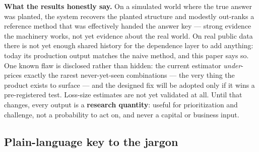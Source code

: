 \documentclass[11pt]{article}
\begin{document}
\textbf{What the results honestly say.} On a simulated world where the true
answer was planted, the system recovers the planted structure and modestly
out-ranks a reference method that was effectively handed the answer key ---
strong evidence the machinery works, not yet evidence about the real world.
On real public data there is not yet enough shared history for the
dependence layer to add anything: today its production output matches the
naive method, and this paper says so. One known flaw is disclosed rather
than hidden: the current estimator \emph{under}-prices exactly the rarest
never-yet-seen combinations --- the very thing the product exists to
surface --- and the designed fix will be adopted only if it wins a
pre-registered test. Loss-size estimates are not yet validated at all.
Until that changes, every output is a \textbf{research quantity}: useful
for prioritization and challenge, not a probability to act on, and never a
capital or business input.

\subsection*{Plain-language key to the jargon}
\end{document}
